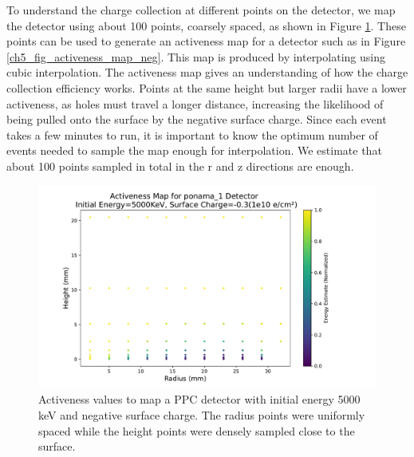 To understand the charge collection at different points on the detector, we map the detector using about 100 points, coarsely spaced, as shown in Figure \ref{ch5_fig_activeness_points_neg}. These points can be used to generate an activeness map for a detector such as in Figure \ref{ch5_fig_activeness_map_neg}. This map is produced by interpolating using cubic interpolation. The activeness map gives an understanding of how the charge collection efficiency works. Points at the same height but larger radii have a lower activeness, as holes must travel a longer distance, increasing the likelihood of being pulled onto the surface by the negative surface charge. Since each event takes a few minutes to run, it is important to know the optimum number of events needed to sample the map enough for interpolation. We estimate that about 100 points sampled in total in the r and z directions are enough.

\begin{figure}%
\includegraphics[trim={0cm 0.5cm 3.2cm 1.15cm},clip,width=0.9\linewidth]{ch5/figs/activenss_map_ponama_1_-0.3.pdf}
\caption{Activeness values to map a PPC detector \ehd with initial energy 5000 keV and negative surface charge. The radius points were uniformly spaced while the height points were densely sampled close to the surface.}
\label{ch5_fig_activeness_points_neg}
\end{figure}

